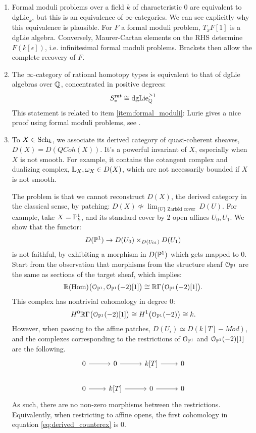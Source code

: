 \documentclass[10pt,a4paper,reqno,oneside]{book} %
\theoremstyle{plain}
\theoremstyle{definition}
\theoremstyle{remark}
\numberwithin{equation}{section}
\begin{document}
\begin{enumerate}
\item \label{item:formal_moduli}
Formal moduli problems over a field $k$ of characteristic 0 are equivalent to $\text{dgLie}_{k}$, but this is
an equivalence of $\infty$-categories. We can see explicitly why this equivalence is plausible. For $F$ a formal moduli problem, 
$T_xF[1]$ is a dgLie algebra. Conversely, Maurer-Cartan elements on the RHS determine $F(k[\epsilon])$, 
i.e. infinitesimal formal moduli problems. Brackets then allow the complete recovery of $F$. 

\item 
The $\infty$-category of rational homotopy types is equivalent to that of dgLie algebras over $\mathbb Q$, concentrated in
positive degrees:
\[	S_*^{\text{rat}} \cong \text{dgLie}_{\mathbb Q}^{\geq 1}	\] 
This statement is related to item \ref{item:formal_moduli}: Lurie gives a nice proof using formal moduli problems, see 
\cite{DAG-XIII}.

\item To $X \in \mathrm{Sch}_k$, we associate its derived category of quasi-coherent sheaves, $D(X) = D(QCoh(X))$. 
It's a powerful invariant of $X$, especially when $X$ is not
smooth. For example, it contains the cotangent complex and dualizing complex, $\mathbb L_X , \omega_X \in D(X)$, which are not 
necessarily bounded if $X$ is not smooth.

The problem is that we cannot reconstruct $D(X)$, the derived category in the classical sense, by patching: $D(X) \not \simeq 
\lim_{\{U\} \text{ Zariski cover }} D(U)$. For example, take $X = \mathbb P^1_k$, and its standard cover by 2 open affines $U_0, U_1$.
We show that the functor:
\[	D(\mathbb P^1) \to D(U_0) \times_{D(U_{01})} D(U_1)	\]
is not faithful, by exhibiting a morphism in $D(\mathbb P^1)$ which gets mapped to 0. Start from the observation that morphisms
from the structure sheaf $\mathcal{O}_{\mathbb P^1}$ are the same as sections of the target sheaf, which implies:
\[	\mathbb R(\operatorname{Hom}) \big(\mathcal{O}_{\mathbb P^1},\mathcal{O}_{\mathbb P^1}(-2)[1]\big) \cong \mathbb R \Gamma\big(\mathcal{O}_{\mathbb P^1}(-2)[1]\big) .	\]
This complex has nontrivial cohomology in degree 0:
\begin{equation}
\label{eq:derived_counterex}
	H^0 \mathbb R \Gamma\big(\mathcal{O}_{\mathbb P^1}(-2)[1]\big) \cong H^1\big(\mathcal{O}_{\mathbb P^1}(-2)\big) \cong k.
\end{equation}
However, when passing to the affine patches, $D(U_i) \simeq D(k[T]-Mod)$, and the complexes corresponding to the
restrictions of $\mathcal{O}_{\mathbb P^1}$ and $\mathcal{O}_{\mathbb P^1}(-2)[1]$ are the following.
\[
\begin{tikzcd}
0\arrow{r} & 0\arrow{r} & k[T]\arrow{r} & 0 \\
0\arrow{r} & k[T]\arrow{r} & 0\arrow{r} & 0
\end{tikzcd}
\]
As such, there are no non-zero morphisms between the restrictions. Equivalently, when restricting to affine opens,
the first cohomology in equation \ref{eq:derived_counterex} is 0.


\end{enumerate}
\end{document}
